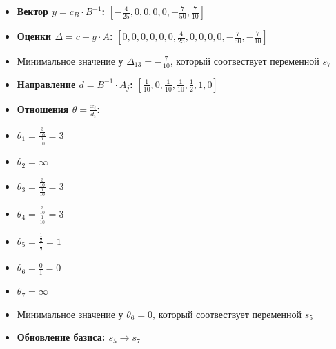 \begin{itemize}
\begin{itemize}
\item \textbf{Вектор $y = c_B \cdot B^{-1}$:}
$[- \frac{4}{25}, 0, 0, 0, 0, - \frac{7}{50}, \frac{7}{10}]$
\item \textbf{Оценки $\Delta = c - y \cdot A$:}
$[0, 0, 0, 0, 0, 0, \frac{4}{25}, 0, 0, 0, 0, - \frac{7}{50}, - \frac{7}{10}]$
\item Минимальное значение у  $\Delta_{13} = - \frac{7}{10}$, который соотвествует переменной $s_7$
\item \textbf{Направление $d = B^{-1} \cdot A_j$:}
$[\frac{1}{10}, 0, \frac{1}{10}, \frac{1}{10}, \frac{1}{2}, 1, 0]$
\item \textbf{Отношения $\theta = \frac{x_i}{d_i}$:}
\item $\theta_{1} = \frac{\frac{3}{10}}{\frac{1}{10}} = 3$
\item $\theta_{2} = \infty$
\item $\theta_{3} = \frac{\frac{3}{10}}{\frac{1}{10}} = 3$
\item $\theta_{4} = \frac{\frac{3}{10}}{\frac{1}{10}} = 3$
\item $\theta_{5} = \frac{\frac{1}{2}}{\frac{1}{2}} = 1$
\item $\theta_{6} = \frac{0}{1} = 0$
\item $\theta_{7} = \infty$
\item Минимальное значение у  $\theta_{6} = 0$, который соотвествует переменной $s_5$
\item \textbf{Обновление базиса: $s_5 \rightarrow s_7$}
\end{itemize}
\newpage

\end{itemize}
